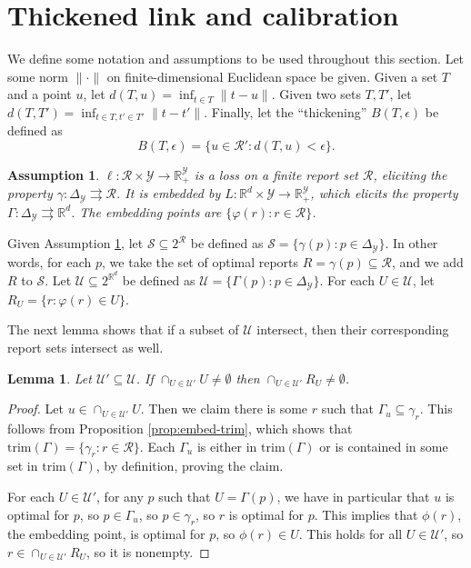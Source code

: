 \documentclass[11pt]{article}
\newcommand{\reals}{\mathbb{R}}
\newcommand{\simplex}{\Delta_\Y}
\newcommand{\R}{\mathcal{R}}
\newcommand{\U}{\mathcal{U}}
\newcommand{\Y}{\mathcal{Y}}
\newcommand{\toto}{\rightrightarrows}
\newcommand{\trim}{\mathrm{trim}}
\newtheorem{lemma}{Lemma}
\newtheorem{assumption}{Assumption}
\begin{document}
\section{Thickened link and calibration} \label{app:calibration}

We define some notation and assumptions to be used throughout this section.
Let some norm $\|\cdot\|$ on finite-dimensional Euclidean space be given.
Given a set $T$ and a point $u$, let $d(T,u) = \inf_{t \in T} \|t-u\|$.
Given two sets $T,T'$, let $d(T,T') = \inf_{t\in T, t' \in T'} \|t-t'\|$.
Finally, let the ``thickening'' $B(T,\epsilon)$ be defined as
  \[ B(T,\epsilon) = \{u \in \R' : d(T,u) < \epsilon \} . \]

\begin{assumption} \label{assume:cal}
  $\ell: \R \times \Y \to \reals^{\Y}_+$ is a loss on a finite report set $\R$, eliciting the property $\gamma: \simplex \toto \R$.
  It is embedded by $L: \reals^d \times \Y \to \reals^{\Y}_+$, which elicits the property $\Gamma: \simplex \toto \reals^d$.
  The embedding points are $\{\varphi(r) : r \in \R\}$.
\end{assumption}

Given Assumption \ref{assume:cal}, let $\mathcal{S} \subseteq 2^{\R}$ be defined as $\mathcal{S} = \{\gamma(p) : p \in \Delta_{\Y}\}$.
In other words, for each $p$, we take the set of optimal reports $R = \gamma(p) \subseteq \R$, and we add $R$ to $\mathcal{S}$.
Let $\U \subseteq 2^{\reals^d}$ be defined as $\U = \{\Gamma(p) : p \in \Delta_{\Y}\}$.
For each $U \in \U$, let $R_U = \{r: \varphi(r) \in U\}$.

The next lemma shows that if a subset of $\U$ intersect, then their corresponding report sets intersect as well.
\begin{lemma} \label{lemma:calibrated-pos}
  Let $\U' \subseteq \U$.
  If $\cap_{U\in\U'} U \neq \emptyset$ then $\cap_{U\in\U'} R_U \neq \emptyset$.
\end{lemma}
\begin{proof}
  Let $u \in \cap_{U\in\U'} U$.
  Then we claim there is some $r$ such that $\Gamma_u \subseteq \gamma_r$.
  This follows from Proposition \ref{prop:embed-trim}, which shows that $\trim(\Gamma) = \{ \gamma_r : r \in \R\}$.
  Each $\Gamma_u$ is either in $\trim(\Gamma)$ or is contained in some set in $\trim(\Gamma)$, by definition, proving the claim.

  For each $U \in \U'$, for any $p$ such that $U = \Gamma(p)$, we have in particular that $u$ is optimal for $p$, so $p \in \Gamma_u$, so $p \in \gamma_r$, so $r$ is optimal for $p$.
  This implies that $\phi(r)$, the embedding point, is optimal for $p$, so $\phi(r) \in U$.
  This holds for all $U \in \U'$, so $r \in \cap_{U\in\U'} R_U$, so it is nonempty.
\end{proof}
\end{document}
